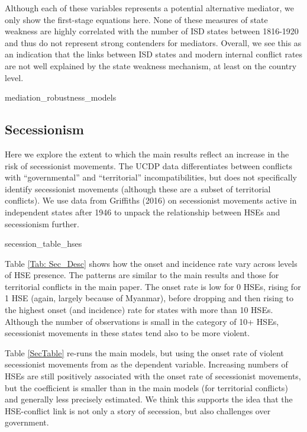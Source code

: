 Although each of these variables represents a potential alternative mediator, we only show the first-stage equations here. None of these measures of state weakness are highly correlated with the number of ISD states between 1816-1920 and thus do not represent strong contenders for mediators. Overall, we see this as an indication that the links between ISD states and modern internal conflict rates are not well explained by the state weakness mechanism, at least on the country level. 

 \clearpage     

{mediation_robustness_models}
    
 \clearpage     

\subsection{Secessionism}

Here we explore the extent to which the main results reflect an increase in the risk of secessionist movements. The UCDP data differentiates between conflicts with ``governmental'' and ``territorial'' incompatibilities, but does not specifically identify secessionist movements (although these are a subset of territorial conflicts). We use data from Griffiths (2016) on secessionist movements active in independent states after 1946 to unpack the relationship between HSEs and secessionism further.  


    {secession_table_hses}

Table \ref{Tab: Sec_Desc} shows how the onset and incidence rate vary across levels of HSE presence. The patterns are similar to the main results and those for territorial conflicts in the main paper. The onset rate is low for 0 HSEs, rising for 1 HSE (again, largely because of Myanmar), before dropping and then rising to the highest onset (and incidence) rate for states with more than 10 HSEs. Although the number of observations is small in the category of 10+ HSEs, secessionist movements in these states tend also to be more violent. 

 
Table \ref{SecTable} re-runs the main models, but using the onset rate of violent secessionist movements from \cite{Griffiths2016} as the dependent variable. Increasing numbers of HSEs are still positively associated with the onset rate of secessionist movements, but the coefficient is smaller than in the main models (for territorial conflicts) and generally less precisely estimated. We think this supports the idea that the HSE-conflict link is not only a story of secession, but also challenges over government. 
    
